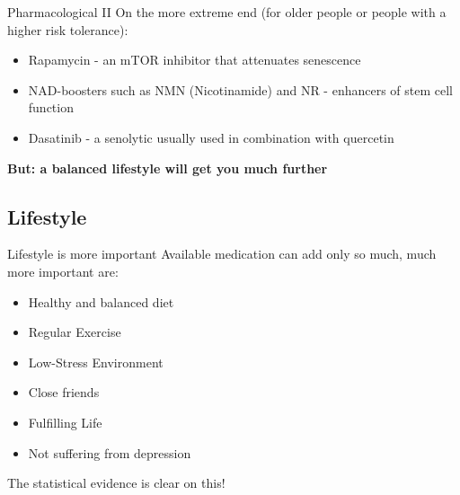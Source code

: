 \begin{frame}[c]{Pharmacological II}
    On the more extreme end (for older people or people with a higher risk tolerance):

    \begin{itemize}[<+(1)->]
        \item Rapamycin - an mTOR inhibitor that attenuates senescence
        \item NAD-boosters such as NMN (Nicotinamide) and NR - enhancers of stem cell function

        \item Dasatinib - a senolytic usually used in combination with quercetin
    \end{itemize}
    \pause
    \LARGE
    \textbf{But: a balanced lifestyle will get you much further}
\end{frame}


\subsection{Lifestyle}

\begin{frame}[c]{Lifestyle is more important}
    \large
    Available medication can add only so much, much more important are:

    \begin{itemize}[<+(1)->]
        \item Healthy and balanced diet \cite{willcox2007caloric}
        \item Regular Exercise \cite{lee1995exercise}
        \item Low-Stress Environment
        \item Close friends \cite{olsen1991social}
        \item Fulfilling Life \cite{diener2011happy}
        \item Not suffering from depression \cite{cuijpers2002excess}
    \end{itemize}
    \pause
    The statistical evidence is clear on this!
\end{frame}
